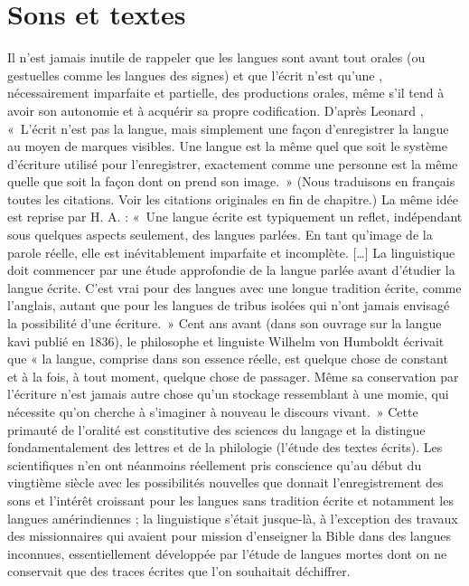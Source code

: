\section{Sons et textes}\label{sec:1.1.2}

Il n’est jamais inutile de rappeler que les langues sont avant tout orales (ou gestuelles comme les langues des signes) et que l’écrit n’est qu’une , nécessairement imparfaite et partielle, des productions orales, même s’il tend à avoir son autonomie et à acquérir sa propre codification. D’après Leonard \citet{Bloomfield1933}, «~L’écrit n’est pas la langue, mais simplement une façon d’enregistrer la langue au moyen de marques visibles. Une langue est la même quel que soit le système d’écriture utilisé pour l’enregistrer, exactement comme une personne est la même quelle que soit la façon dont on prend son image.~» (Nous traduisons en français toutes les citations. Voir les citations originales en fin de chapitre.) La même idée est reprise par H. A. \citet{Gleason1961} : «~Une langue écrite est typiquement un reflet, indépendant sous quelques aspects seulement, des langues parlées. En tant qu’image de la parole réelle, elle est inévitablement imparfaite et incomplète. […] La linguistique doit commencer par une étude approfondie de la langue parlée avant d’étudier la langue écrite. C’est vrai pour des langues avec une longue tradition écrite, comme l’anglais, autant que pour les langues de tribus isolées qui n’ont jamais envisagé la possibilité d’une écriture.~» Cent ans avant (dans son ouvrage sur la langue kavi publié en 1836), le philosophe et linguiste Wilhelm von Humboldt écrivait que « la langue, comprise dans son essence réelle, est quelque chose de constant et à la fois, à tout moment, quelque chose de passager. Même sa conservation par l’écriture n’est jamais autre chose qu’un stockage ressemblant à une momie, qui nécessite qu’on cherche à s’imaginer à nouveau le discours vivant.~» Cette primauté de l’oralité est constitutive des sciences du langage et la distingue fondamentalement des lettres et de la philologie (l’étude des textes écrits). Les scientifiques n’en ont néanmoins réellement pris conscience qu’au début du vingtième siècle avec les possibilités nouvelles que donnait l’enregistrement des sons et l’intérêt croissant pour les langues sans tradition écrite et notamment les langues amérindiennes ; la linguistique s’était jusque-là, à l’exception des travaux des missionnaires qui avaient pour mission d’enseigner la Bible dans des langues inconnues, essentiellement développée par l’étude de langues mortes dont on ne conservait que des traces écrites que l’on souhaitait déchiffrer.


